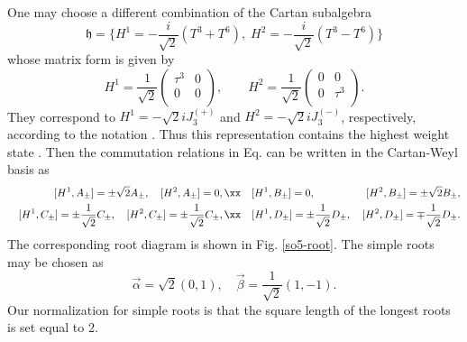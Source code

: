 \documentclass[12pt,epsf]{article}
\begin{document}
One may choose a different combination of the Cartan subalgebra
\begin{equation}\label{cartan-b}
  \mathfrak{h} = \{ H^1 = -\frac{i}{\sqrt{2}}(T^3 + T^6), \; H^2 = -\frac{i}{\sqrt{2}}(T^3 - T^6) \}
\end{equation}
whose matrix form is given by
\begin{equation} \label{bcw-basis}
H^{1} = \frac{1}{\sqrt{2}} \left(
                                   \begin{array}{cc}
                                     \tau^3 & 0 \\
                                     0 & 0 \\
                                   \end{array}
                                 \right), \qquad
 H^{2} = \frac{1}{\sqrt{2}} \left(
                                   \begin{array}{cc}
                                     0 & 0 \\
                                     0 & \tau^3 \\
                                   \end{array}
                                 \right).
\end{equation}
They correspond to $H^1 = - \sqrt{2} i J^{(+)}_3$ and $H^2 = - \sqrt{2} i J^{(-)}_3$, respectively,
according to the notation .
Thus this representation contains the highest weight state .
Then the commutation relations in Eq.  can be written in the Cartan-Weyl basis as
\begin{eqnarray}\label{cartan-weyl}
  && [H^1, A_\pm ] = \pm \sqrt{2} A_\pm, \quad [H^2, A_\pm ] = 0, \xx
  && [H^1, B_\pm ] = 0, \hspace{1.7cm} [H^2, B_\pm ] = \pm \sqrt{2} B_\pm, \\
  && [H^1, C_\pm ] = \pm \frac{1}{\sqrt{2}} C_\pm, \quad [H^2, C_\pm ] = \pm \frac{1}{\sqrt{2}} C_\pm, \xx
  && [H^1, D_\pm ] = \pm \frac{1}{\sqrt{2}} D_\pm,  \quad [H^2, D_\pm ] = \mp \frac{1}{\sqrt{2}} D_\pm.  \nonumber
\end{eqnarray}
The corresponding root diagram is shown in Fig. \ref{so5-root}. The simple roots may be chosen as
\begin{equation}\label{sroot}
  \vec{\alpha}= \sqrt{2}(0,1), \quad \vec{\beta}=\frac{1}{\sqrt{2}}(1,-1).
\end{equation}
Our normalization for simple roots is that the square length of the longest roots is set equal to 2.
\end{document}
